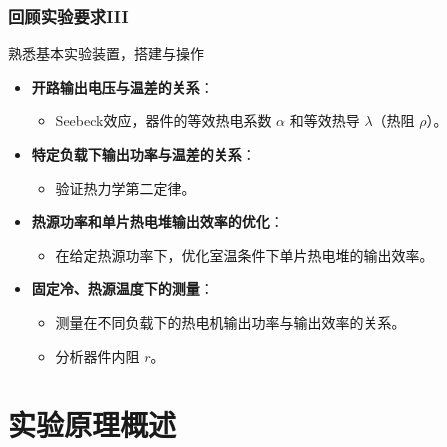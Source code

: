 \documentclass[aspectratio=169]{beamer}
\begin{document}
	\begin{frame}
		\frametitle{回顾实验要求III}
		
		\begin{block}{熟悉基本实验装置，搭建与操作}
			\begin{itemize}
				\item \textbf{开路输出电压与温差的关系}：
				\begin{itemize}
					\item Seebeck效应，器件的等效热电系数 $\alpha$ 和等效热导 $\lambda$（热阻 $\rho$）。
				\end{itemize}
				
				\item \textbf{特定负载下输出功率与温差的关系}：
				\begin{itemize}
					\item 验证热力学第二定律。
				\end{itemize}
				
				\item \textbf{热源功率和单片热电堆输出效率的优化}：
				\begin{itemize}
					\item 在给定热源功率下，优化室温条件下单片热电堆的输出效率。
				\end{itemize}
				
				\item \textbf{固定冷、热源温度下的测量}：
				\begin{itemize}
					\item 测量在不同负载下的热电机输出功率与输出效率的关系。
					\item 分析器件内阻 $r$。
				\end{itemize}
			\end{itemize}
		\end{block}
	\end{frame}
	
	
	
	\section{实验原理概述}
	
	
\end{document}
